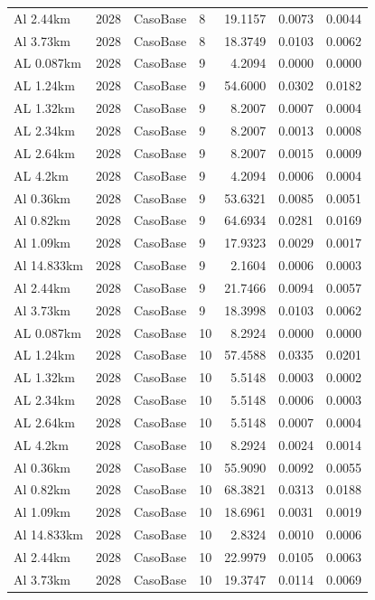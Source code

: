 \documentclass[11pt,a4paper]{article}
\begin{document}
\begin{longtable}{llllrrr}
Al 2.44km & 2028 & CasoBase & 8 & 19.1157 & 0.0073 & 0.0044 \\
Al 3.73km & 2028 & CasoBase & 8 & 18.3749 & 0.0103 & 0.0062 \\
AL 0.087km & 2028 & CasoBase & 9 & 4.2094 & 0.0000 & 0.0000 \\
AL 1.24km & 2028 & CasoBase & 9 & 54.6000 & 0.0302 & 0.0182 \\
AL 1.32km & 2028 & CasoBase & 9 & 8.2007 & 0.0007 & 0.0004 \\
AL 2.34km & 2028 & CasoBase & 9 & 8.2007 & 0.0013 & 0.0008 \\
AL 2.64km & 2028 & CasoBase & 9 & 8.2007 & 0.0015 & 0.0009 \\
AL 4.2km & 2028 & CasoBase & 9 & 4.2094 & 0.0006 & 0.0004 \\
Al 0.36km & 2028 & CasoBase & 9 & 53.6321 & 0.0085 & 0.0051 \\
Al 0.82km & 2028 & CasoBase & 9 & 64.6934 & 0.0281 & 0.0169 \\
Al 1.09km & 2028 & CasoBase & 9 & 17.9323 & 0.0029 & 0.0017 \\
Al 14.833km & 2028 & CasoBase & 9 & 2.1604 & 0.0006 & 0.0003 \\
Al 2.44km & 2028 & CasoBase & 9 & 21.7466 & 0.0094 & 0.0057 \\
Al 3.73km & 2028 & CasoBase & 9 & 18.3998 & 0.0103 & 0.0062 \\
AL 0.087km & 2028 & CasoBase & 10 & 8.2924 & 0.0000 & 0.0000 \\
AL 1.24km & 2028 & CasoBase & 10 & 57.4588 & 0.0335 & 0.0201 \\
AL 1.32km & 2028 & CasoBase & 10 & 5.5148 & 0.0003 & 0.0002 \\
AL 2.34km & 2028 & CasoBase & 10 & 5.5148 & 0.0006 & 0.0003 \\
AL 2.64km & 2028 & CasoBase & 10 & 5.5148 & 0.0007 & 0.0004 \\
AL 4.2km & 2028 & CasoBase & 10 & 8.2924 & 0.0024 & 0.0014 \\
Al 0.36km & 2028 & CasoBase & 10 & 55.9090 & 0.0092 & 0.0055 \\
Al 0.82km & 2028 & CasoBase & 10 & 68.3821 & 0.0313 & 0.0188 \\
Al 1.09km & 2028 & CasoBase & 10 & 18.6961 & 0.0031 & 0.0019 \\
Al 14.833km & 2028 & CasoBase & 10 & 2.8324 & 0.0010 & 0.0006 \\
Al 2.44km & 2028 & CasoBase & 10 & 22.9979 & 0.0105 & 0.0063 \\
Al 3.73km & 2028 & CasoBase & 10 & 19.3747 & 0.0114 & 0.0069 \\

\end{longtable}
\end{document}
